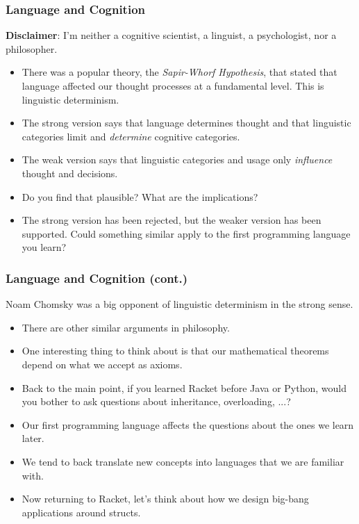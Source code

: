 \documentclass{beamer}
\begin{document}
\begin{frame}
  \frametitle{Language and Cognition}
  \textbf{Disclaimer}: I'm neither a cognitive scientist, a linguist, a psychologist, nor a philosopher.
  \begin{itemize}
  \item<2-> There was a popular theory, the \emph{Sapir-Whorf Hypothesis},
    that stated that language affected our thought processes
    at a fundamental level. This is linguistic determinism.
  \item<3-> The strong version says that language determines thought and that linguistic categories limit and \emph{determine} cognitive categories.
  \item<4->The weak version says that linguistic categories and usage only \emph{influence} thought and decisions.
  \item<5-> Do you find that plausible? What are the implications?
  \item<6-> The strong version has been rejected, but the weaker version has been supported. Could something similar apply to the first programming language
    you learn?
  \end{itemize}
\end{frame}

\begin{frame}
  \frametitle{Language and Cognition (cont.)}
  Noam Chomsky was a big opponent of linguistic determinism in the strong sense.
  \begin{itemize}
  \item<2-> There are other similar arguments in philosophy.
  \item<3-> One interesting thing to think about is that our mathematical
    theorems depend on what we accept as axioms.
  \item<4-> Back to the main point, if you learned Racket before Java or Python,
    would you bother to ask questions about inheritance, overloading, ...?
  \item<5-> Our first programming language affects the questions about
    the ones we learn later.
  \item<6-> We tend to back translate new concepts into languages that we are
    familiar with.
  \item<7-> Now returning to Racket, let's think about how we design big-bang
    applications around structs.
  \end{itemize}
\end{frame}
\end{document}
